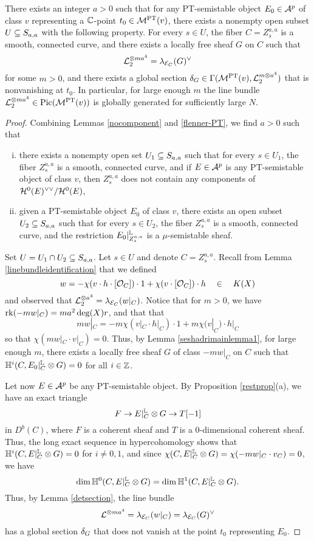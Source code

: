 \begin{thm}\label{globgen}
    There exists an integer $a > 0$ such that for any PT-semistable object $E_0 \in \mathcal{A}^p$ of class $v$ representing a $\mathbb{C}$-point $t_0 \in \mathcal{M}^{\mathrm{PT}}(v)$, there exists a nonempty open subset $U \subseteq S_{a,a}$ with the following property. For every $s \in U$, the fiber $C = Z^{a,a}_s$ is a smooth, connected curve, and there exists a locally free sheaf $G$ on $C$ such that
    \[ \mathcal{L}_2^{\otimes m a^4} = \lambda_{\mathcal{E}_C}(G)^\vee \]
    for some $m > 0$, and there exists a global section $\delta_G \in \Gamma(\mathcal{M}^{\mathrm{PT}}(v), \mathcal{L}_2^{m \otimes a^4})$ that is nonvanishing at $t_0$. In particular, for large enough $m$ the line bundle $\mathcal{L}_2^{\otimes m a^4} \in \mathrm{Pic}(\mathcal{M}^{\mathrm{PT}}(v))$ is globally generated for sufficiently large $N$.
\end{thm}
\begin{proof}
    Combining Lemmas \ref{nocomponent} and \ref{flenner-PT}, we find $a > 0$ such that
    \begin{enumerate}[(i)]
        \item there exists a nonempty open set $U_1 \subseteq S_{a,a}$ such that for every $s \in U_1$, the fiber $Z^{a,a}_s$ is a smooth, connected curve, and if $E \in \mathcal{A}^p$ is any PT-semistable object of class $v$, then $Z^{a,a}_s$ does not contain any components of $\mathcal{H}^0(E)^{\vee\vee}/\mathcal{H}^0(E)$,
        \item given a PT-semistable object $E_0$ of class $v$, there exists an open subset $U_2 \subseteq S_{a,a}$ such that for every $s \in U_2$, the fiber $Z^{a,a}_s$ is a smooth, connected curve, and the restriction $E_0|^{\mathbb{L}}_{Z^{a,a}_s}$ is a $\mu$-semistable sheaf.
    \end{enumerate}
    Set $U = U_1 \cap U_2 \subseteq S_{a,a}$. Let $s \in U$ and denote $C = Z^{a,a}_s$. Recall from Lemma \ref{linebundleidentification} that we defined
    \[ w = -\chi(v \cdot h \cdot [\mathcal{O}_C]) \cdot 1 + \chi(v \cdot [\mathcal{O}_C]) \cdot h \quad\in\quad K(X) \]
    and observed that $\mathcal{L}_2^{\otimes a^4} = \lambda_{\mathcal{E}_C}(w|_C)$. Notice that for $m > 0$, we have $\operatorname{\mathrm{rk}}(-m w|_C) = m a^2 \deg(X) r$, and that that
    \[ m w|_C = - m \chi(v|_C \cdot h|_C) \cdot 1 + m \chi(v|_C) \cdot h|_C \]
    so that $\chi(m w|_C \cdot v|_C) = 0$. Thus, by Lemma \ref{seshadrimainlemma1}, for large enough $m$, there exists a locally free sheaf $G$ of class $-m w|_C$ on $C$ such that $\mathbb{H}^i(C, E_0|^{\mathbb{L}}_C \otimes G) = 0$ for all $i \in \mathbb{Z}$.
    
    Let now $E \in \mathcal{A}^p$ be any PT-semistable object. By Proposition \ref{restprop}(a), we have an exact triangle
    \[ F \to E|^{\mathbb{L}}_C \otimes G \to T[-1] \]
    in $D^b(C)$, where $F$ is a coherent sheaf and $T$ is a 0-dimensional coherent sheaf. Thus, the long exact sequence in hypercohomology shows that $\mathbb{H}^i(C, E|^{\mathbb{L}}_C \otimes G) = 0$ for $i \neq 0, 1$, and since $\chi(C, E|^{\mathbb{L}}_C \otimes G) = \chi(-m w|_C \cdot v_C) = 0$, we have
    \[ \dim \mathbb{H}^0(C, E|^{\mathbb{L}}_C \otimes G) = \dim \mathbb{H}^1(C, E|^{\mathbb{L}}_C \otimes G). \]
    Thus, by Lemma \ref{detsection}, the line bundle
    \[ \mathcal{L}^{\otimes m a^4} = \lambda_{\mathcal{E}_C}(w|_C) = \lambda_{\mathcal{E}_C}(G)^\vee \]
    has a global section $\delta_G$ that does not vanish at the point $t_0$ representing $E_0$.
    

\end{proof}

